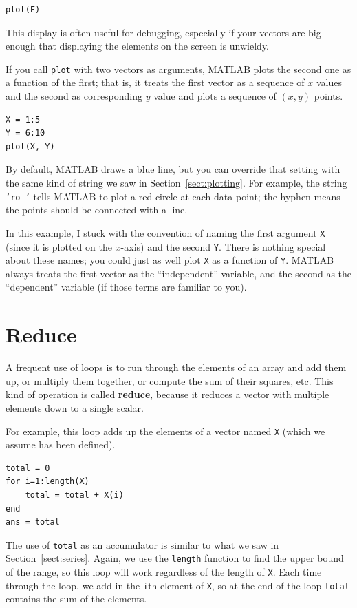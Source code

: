 \documentclass[
]{book}
\begin{document}
\begin{verbatim}
plot(F)
\end{verbatim}

This display is often useful for debugging, especially
if your vectors are big enough that displaying the elements on
the screen is unwieldy.

If you call {\tt plot} with two vectors as arguments, MATLAB plots
the second one as a function of the first; that is, it treats
the first vector as a sequence of $x$ values and the second as
corresponding $y$ value and plots a sequence of $(x, y)$ points.

\begin{verbatim}
X = 1:5
Y = 6:10
plot(X, Y)
\end{verbatim}

By default, MATLAB draws a blue line, but you can override that
setting with the same kind of string we saw in Section~\ref{sect:plotting}.
For example, the string {\tt 'ro-'} tells MATLAB to plot a red circle
at each data point; the hyphen means the points should be connected
with a line.

In this example, I stuck with the convention of naming the first
argument {\tt X} (since it is plotted on the $x$-axis) and the
second {\tt Y}.  There is nothing special about these names;
you could just as well plot {\tt X} as a function of {\tt Y}.
MATLAB always treats the first vector as the ``independent''
variable, and the second as the ``dependent'' variable (if those
terms are familiar to you).



\section{Reduce}
\label{sect:reduce}

A frequent use of loops is to run through the elements of an array
and add them up, or multiply them together, or compute the sum
of their squares, etc.  This kind of operation is called {\bf reduce},
because it reduces a vector with multiple elements down to a single
scalar.

For example, this loop adds up the elements of a vector named {\tt X}
(which we assume has been defined).

\begin{verbatim}
total = 0
for i=1:length(X)
    total = total + X(i)
end
ans = total
\end{verbatim}

The use of {\tt total} as an accumulator is similar to what we
saw in Section~\ref{sect:series}.  Again, we use the {\tt length} function
to find the upper bound of the range, so this loop will work
regardless of the length of {\tt X}.
Each time through the loop, we add
in the {\tt i}th element of {\tt X}, so at the end of the loop
{\tt total} contains the sum of the elements.
\end{document}
